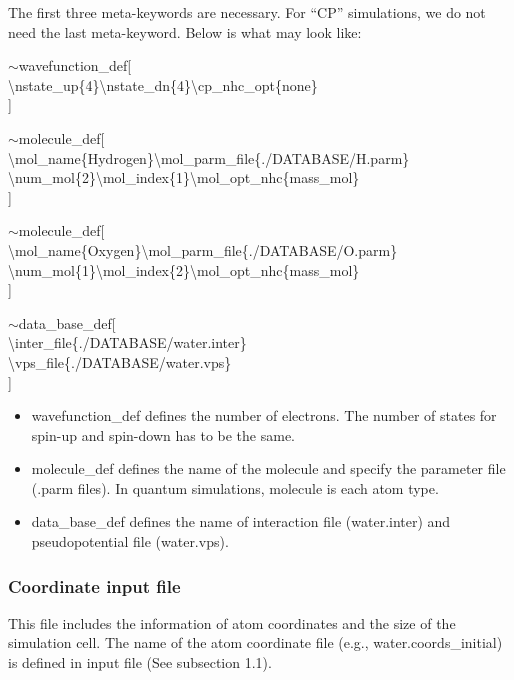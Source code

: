 The first three meta-keywords are necessary. For ``CP'' simulations, we do not need the last meta-keyword. Below is what {\selectfont{water.set}} may look like:

{\selectfont
$\sim$wavefunction\_def[\\
\textbackslash nstate\_up\{4\}\textbackslash nstate\_dn\{4\}\textbackslash cp\_nhc\_opt\{none\}\\
 ]

$\sim$molecule\_def[\\
\textbackslash mol\_name\{Hydrogen\}\textbackslash mol\_parm\_file\{./DATABASE/H.parm\}\\
\textbackslash num\_mol\{2\}\textbackslash mol\_index\{1\}\textbackslash mol\_opt\_nhc\{mass\_mol\}\\
]

$\sim$molecule\_def[\\
\textbackslash mol\_name\{Oxygen\}\textbackslash mol\_parm\_file\{./DATABASE/O.parm\}\\
\textbackslash num\_mol\{1\}\textbackslash mol\_index\{2\}\textbackslash mol\_opt\_nhc\{mass\_mol\}\\
]

$\sim$data\_base\_def[\\
\textbackslash inter\_file\{./DATABASE/water.inter\}\\
\textbackslash vps\_file\{./DATABASE/water.vps\}\\
]

}
\begin{itemize}
\item {\selectfont wavefunction\_def} defines the number of electrons. The number of states for spin-up and spin-down has to be the same. 

\item {\selectfont molecule\_def }defines the name of the molecule and specify the parameter file (.parm files). In quantum simulations, molecule is each atom type. 

\item {\selectfont data\_base\_def} defines the name of interaction file (water.inter) and pseudopotential file (water.vps).  
\end{itemize}

\subsubsection{Coordinate input file}
This file includes the information of atom coordinates and the size of the simulation cell. The name of the atom coordinate file (e.g., water.coords\_initial) is defined in input file (See subsection 1.1).

